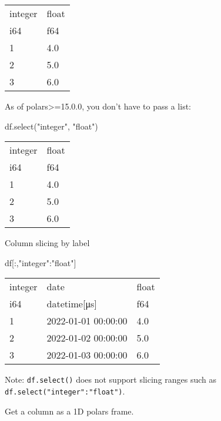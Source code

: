 \documentclass[
  letterpaper,
  DIV=11,
  numbers=noendperiod]{scrartcl}
\newenvironment{Shaded}{\begin{snugshade}}{\end{snugshade}}
\newcommand{\NormalTok}[1]{\textcolor[rgb]{0.00,0.23,0.31}{#1}}
\newcommand{\StringTok}[1]{\textcolor[rgb]{0.13,0.47,0.30}{#1}}
\begin{document}
\begin{longtable}[]{@{}ll@{}}
\toprule()
integer & float \\
i64 & f64 \\
\midrule()
\endhead
1 & 4.0 \\
2 & 5.0 \\
3 & 6.0 \\
\bottomrule()
\end{longtable}

As of polars\textgreater=15.0.0, you don't have to pass a list:

\begin{Shaded}
\begin{Highlighting}[]
\NormalTok{df.select(}\StringTok{"integer"}\NormalTok{, }\StringTok{"float"}\NormalTok{)}
\end{Highlighting}
\end{Shaded}

\begin{longtable}[]{@{}ll@{}}
\toprule()
integer & float \\
i64 & f64 \\
\midrule()
\endhead
1 & 4.0 \\
2 & 5.0 \\
3 & 6.0 \\
\bottomrule()
\end{longtable}

Column slicing by label

\begin{Shaded}
\begin{Highlighting}[]
\NormalTok{df[:,}\StringTok{"integer"}\NormalTok{:}\StringTok{"float"}\NormalTok{]}
\end{Highlighting}
\end{Shaded}

\begin{longtable}[]{@{}lll@{}}
\toprule()
integer & date & float \\
i64 & datetime{[}μs{]} & f64 \\
\midrule()
\endhead
1 & 2022-01-01 00:00:00 & 4.0 \\
2 & 2022-01-02 00:00:00 & 5.0 \\
3 & 2022-01-03 00:00:00 & 6.0 \\
\bottomrule()
\end{longtable}

Note: \texttt{df.select()} does not support slicing ranges such as
\texttt{df.select("integer":"float")}.

Get a column as a 1D polars frame.
\end{document}
